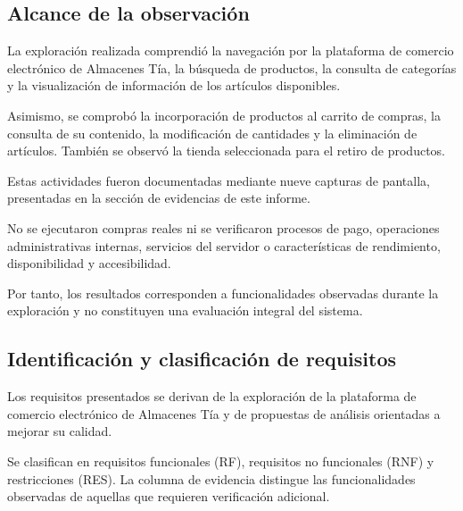 \subsection{Alcance de la observación}


La exploración realizada comprendió la navegación
por la plataforma de comercio electrónico de
Almacenes Tía, la búsqueda de productos, la
consulta de categorías y la visualización de
información de los artículos disponibles.

Asimismo, se comprobó la incorporación de
productos al carrito de compras, la consulta
de su contenido, la modificación de cantidades
y la eliminación de artículos. También se
observó la tienda seleccionada para el retiro
de productos.

Estas actividades fueron documentadas mediante
nueve capturas de pantalla, presentadas en
la sección de evidencias de este informe.

No se ejecutaron compras reales ni se
verificaron procesos de pago, operaciones
administrativas internas, servicios del
servidor o características de rendimiento,
disponibilidad y accesibilidad.

Por tanto, los resultados corresponden a
funcionalidades observadas durante la
exploración y no constituyen una evaluación
integral del sistema.




\subsection{Identificación y clasificación de requisitos}

Los requisitos presentados se derivan de la
exploración de la plataforma de comercio
electrónico de Almacenes Tía y de propuestas
de análisis orientadas a mejorar su calidad.

Se clasifican en requisitos funcionales (RF),
requisitos no funcionales (RNF) y restricciones
(RES). La columna de evidencia distingue
las funcionalidades observadas de aquellas
que requieren verificación adicional.


